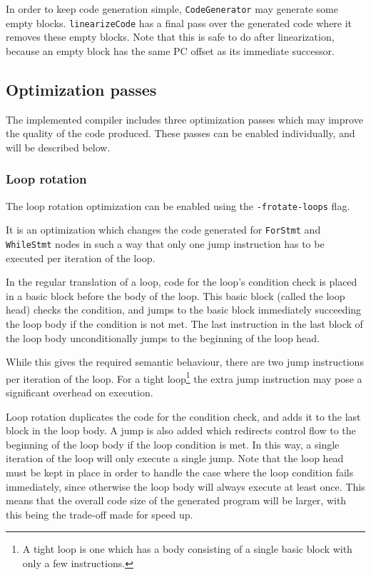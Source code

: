 \documentclass[11pt,a4paper]{scrartcl}
\begin{document}
In order to keep code generation simple, \verb|CodeGenerator| may generate some empty blocks. \verb|linearizeCode| has a final pass over the generated code where it removes these empty blocks. Note that this is safe to do after linearization, because an empty block has the same PC offset as its immediate successor.

\subsection{Optimization passes}

The implemented compiler includes three optimization passes which may improve the quality of the code produced. These passes can be enabled individually, and will be described below.

\subsubsection{Loop rotation}

The loop rotation optimization can be enabled using the \verb|-frotate-loops| flag.

It is an optimization which changes the code generated for \verb|ForStmt| and \verb|WhileStmt| nodes in such a way that only one jump instruction has to be executed per iteration of the loop.

In the regular translation of a loop, code for the loop's condition check is placed in a basic block before the body of the loop. This basic block (called the loop head) checks the condition, and jumps to the basic block immediately succeeding the loop body if the condition is not met. The last instruction in the last block of the loop body unconditionally jumps to the beginning of the loop head.

While this gives the required semantic behaviour, there are two jump instructions per iteration of the loop. For a tight loop\footnote{A tight loop is one which has a body consisting of a single basic block with only a few instructions.} the extra jump instruction may pose a significant overhead on execution.

Loop rotation duplicates the code for the condition check, and adds it to the last block in the loop body. A jump is also added which redirects control flow to the beginning of the loop body if the loop condition is met. In this way, a single iteration of the loop will only execute a single jump. Note that the loop head must be kept in place in order to handle the case where the loop condition fails immediately, since otherwise the loop body will always execute at least once. This means that the overall code size of the generated program will be larger, with this being the trade-off made for speed up.
\end{document}
